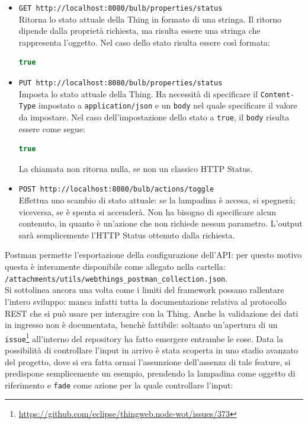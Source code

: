 \documentclass[12pt,a4paper,openright,oneside]{report}
\begin{document}
\begin{itemize}
	\item \texttt{GET http://localhost:8080/bulb/properties/status}\\
	Ritorna lo stato attuale della Thing in formato di una stringa. Il ritorno dipende dalla proprietà richiesta, ma risulta essere una stringa che rappresenta l'oggetto. Nel caso dello stato risulta essere così formata:
	\begin{lstlisting}[language=JavaScript]
	  true
	\end{lstlisting}
	
	\item \texttt{PUT http://localhost:8080/bulb/properties/status}\\
	Imposta lo stato attuale della Thing. Ha necessità di specificare il \texttt{Content-Type} impostato a \texttt{application/json} e un \texttt{body} nel quale specificare il valore da impostare. Nel caso dell'impostazione dello stato a \texttt{true}, il \texttt{body} risulta essere come segue: 
	\begin{lstlisting}[language=JavaScript]
	  true
	\end{lstlisting}
	La chiamata non ritorna nulla, se non un classico HTTP Status.

	\item \texttt{POST http://localhost:8080/bulb/actions/toggle}\\
	Effettua uno scambio di stato attuale: se la lampadina è accesa, si spegnerà; viceversa, se è spenta si accenderà. Non ha bisogno di specificare alcun contenuto, in quanto è un'azione che non richiede nessun parametro. L'output sarà semplicemente l'HTTP Status ottenuto dalla richiesta.
\end{itemize}

Postman permette l'esportazione della configurazione dell'API: per questo motivo questa è interamente disponibile come allegato nella cartella:\\ \texttt{/attachments/utils/webthings\_postman\_collection.json}.\\

Si sottolinea ancora una volta come i limiti del framework possano rallentare l'intero sviluppo: manca infatti tutta la documentazione relativa al protocollo REST che si può usare per interagire con la Thing. Anche la validazione dei dati in ingresso non è documentata, benchè fattibile: soltanto un'apertura di un \texttt{issue}\footnote{\url{https://github.com/eclipse/thingweb.node-wot/issues/373}} all'interno del repository ha fatto emergere entrambe le cose. Data la possibilità di controllare l'input in arrivo è stata scoperta in uno stadio avanzato del progetto, dove si era fatta ormai l'assunzione dell'assenza di tale feature, si predispone semplicemente un esempio, prendendo la lampadina come oggetto di riferimento e \texttt{fade} come azione per la quale controllare l'input:
\end{document}
